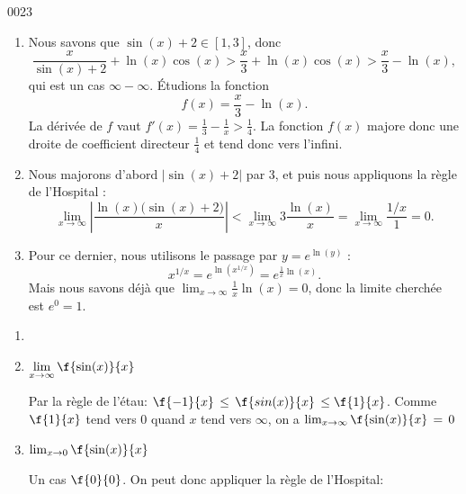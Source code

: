 \begin{corrige}{0023}
\begin{enumerate}
\item
Nous savons que $\sin(x)+2\in[1,3]$, donc
\begin{equation}
	\frac{ x }{ \sin(x)+2 }+\ln(x)\cos(x)>\frac{ x }{ 3 }+\ln(x)\cos(x)>\frac{ x }{ 3 }-\ln(x),
\end{equation}
qui est un cas $\infty-\infty$. Étudions la fonction
\begin{equation}		\label{Eq0023ffrac}
	f(x)=\frac{ x }{ 3 }-\ln(x).
\end{equation}
La dérivée de $f$ vaut $f'(x)=\frac{1}{ 3 }-\frac{1}{ x }>\frac{1}{ 4 }$. La fonction $f(x)$ majore donc une droite de coefficient directeur $\frac{ 1 }{ 4 }$ et tend donc vers l'infini.

\item
Nous majorons d'abord $|\sin(x)+2|$ par $3$, et puis nous appliquons la règle de l'Hospital :
\begin{equation}
	\lim_{x\to\infty}\left| \frac{ \ln(x)\big( \sin(x)+2 \big) }{ x } \right|<\lim_{x\to\infty}3\frac{ \ln(x) }{ x }=\lim_{x\to\infty}\frac{ 1/x }{ 1 }=0.
\end{equation}

\item
Pour ce dernier, nous utilisons le passage par $y= e^{\ln(y)}$ :
\begin{equation}
	x^{1/x}= e^{\ln(x^{1/x})}= e^{\frac{1}{ x }\ln(x)}.
\end{equation}
Mais nous savons déjà que $\lim_{x\to\infty}\frac{1}{ x }\ln(x)=0$, donc la limite cherchée est $ e^{0}=1$.

\end{enumerate}

\begin{alternative}

	\begin{enumerate}

		\item

		\item $\displaystyle{ \lim_{x\rightarrow \infty}\f{\sin(x)}{x}}$

		Par la règle de l'étau: $ \f{-1}{x} \, \leq\, \f{sin(x)}{x} \,\leq \f{1}{x}$. Comme $\f{1}{x}$ tend vers $0$ quand $x$ tend vers $\infty$, on a $ \lim_{x\rightarrow\infty}\f{\sin(x)}{x} \, =\,0$

		\item $ \lim_{x\rightarrow 0}\f{\sin(x)}{x}$

		Un cas $\f{0}{0}$. On peut donc appliquer la règle de l'Hospital:


\end{enumerate}
\end{alternative}
\end{corrige}
